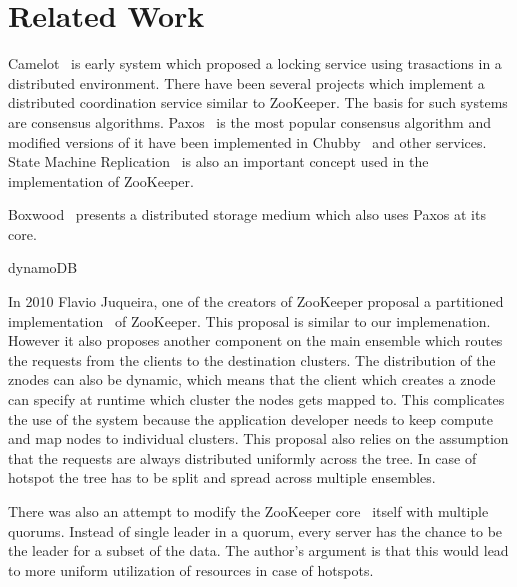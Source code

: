 \chapter{Related Work}
Camelot~\cite{hastings1990distributed} is early system which proposed a locking service using trasactions in a distributed environment. 
There have been several projects which implement a distributed coordination service similar to ZooKeeper. The basis for such systems are consensus algorithms. Paxos~\cite{lamport2001paxos} is the most popular consensus algorithm and modified versions of it have been implemented in Chubby~\cite{burrows2006chubby} and other services. State Machine Replication~\cite{schneider1990implementing} is also an important concept used in the implementation of ZooKeeper.

Boxwood~\cite{maccormick2004boxwood} presents a distributed storage medium which also uses Paxos at its core.

dynamoDB~\cite{vogels2012amazon}

In 2010 Flavio Juqueira, one of the creators of ZooKeeper proposal a partitioned implementation~\cite{junqueira2010partitioned} of ZooKeeper. This proposal is similar to our implemenation. However it also proposes another component on the main ensemble which routes the requests from the clients to the destination clusters. The distribution of the znodes can also be dynamic, which means that the client which creates a znode can specify at runtime which cluster the nodes gets mapped to. This complicates the use of the system because the application developer needs to keep compute and map nodes to individual clusters. This proposal also relies on the assumption that the requests are always distributed uniformly across the tree. In case of hotspot the tree has to be split and spread across multiple ensembles.

There was also an attempt to modify the ZooKeeper core~\cite{biligiri2014multiquorum} itself with multiple quorums. Instead of single leader in a quorum, every server has the chance to be the leader for a subset of the data. The author's argument is that this would lead to more uniform utilization of resources in case of hotspots. 

